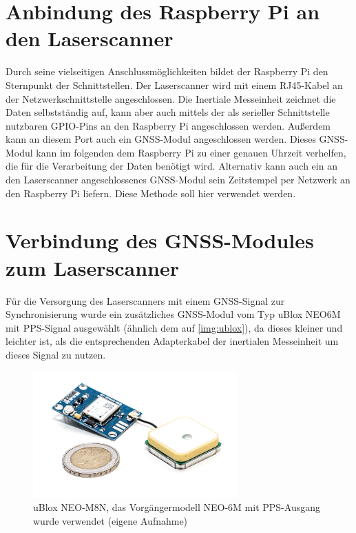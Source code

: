 \documentclass[a4paper,12pt,bibliography=totoc, listof=totoc,titlepage,pointlessnumbers]{scrreprt}
\begin{document}
\section{Anbindung des Raspberry Pi an den Laserscanner}
Durch seine vielseitigen Anschlussmöglichkeiten bildet der Raspberry Pi den Sternpunkt der Schnittstellen. Der Laserscanner wird mit einem RJ45-Kabel an der Netzwerkschnittstelle angeschlossen. Die Inertiale Messeinheit zeichnet die Daten selbstständig auf, kann aber auch mittels der als serieller Schnittstelle nutzbaren GPIO-Pins an den Raspberry Pi angeschlossen werden. Außerdem kann an diesem Port auch ein GNSS-Modul angeschlossen werden. Dieses GNSS-Modul kann im folgenden dem Raspberry Pi zu einer genauen Uhrzeit verhelfen, die für die Verarbeitung der Daten benötigt wird. Alternativ kann auch ein an den Laserscanner angeschlossenes GNSS-Modul sein Zeitstempel per Netzwerk an den Raspberry Pi liefern. Diese Methode soll hier verwendet werden.

\section{Verbindung des GNSS-Modules zum Laserscanner}
\label{s:GNSSAnschluss}
Für die Versorgung des Laserscanners mit einem GNSS-Signal zur Synchronisierung wurde ein zusätzliches GNSS-Modul vom Typ uBlox NEO6M mit PPS-Signal ausgewählt (ähnlich dem auf \autoref{img:ublox}), da dieses kleiner und leichter ist, als die entsprechenden Adapterkabel der inertialen Messeinheit um dieses Signal zu nutzen.

\begin{figure}
 \centering
 \includegraphics[width=0.7\textwidth]{./img/ublox.jpg}
 \caption{uBlox NEO-M8N, das Vorgängermodell NEO-6M mit PPS-Ausgang wurde verwendet (eigene Aufnahme)}
 \label{img:ublox}
\end{figure}
\end{document}
